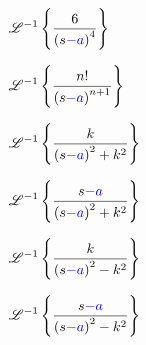 \documentclass[multi={mymath},convert={density=1200}]{standalone}
\newenvironment{mymath}{$\displaystyle}{$}
\newcommand{\invLap}{\ensuremath{\mathscr{L}^{-1}}}
\begin{document}
\begin{mymath}
  \invLap\left\{ 
    \frac{6}{\left(s{\color{blue}-a}\right)^{4}}
  \right\} 
\end{mymath}

\begin{mymath}
  \invLap\left\{ 
    \frac{n!}{\left(s{\color{blue}-a}\right)^{n+1}}
  \right\} 
\end{mymath}

\begin{mymath}
  \invLap\left\{ 
    \frac{k}{\left(s{\color{blue}-a}\right)^{2}+k^{2}}
  \right\} 
\end{mymath}

\begin{mymath}
  \invLap\left\{ 
    \frac{s{\color{blue}-a}}{\left(s{\color{blue}-a}\right)^{2}+k^{2}}
  \right\} 
\end{mymath}

\begin{mymath}
  \invLap\left\{ 
    \frac{k}{\left(s{\color{blue}-a}\right)^{2}-k^{2}}
  \right\} 
\end{mymath}

\begin{mymath}
  \invLap\left\{ 
    \frac{s{\color{blue}-a}}{\left(s{\color{blue}-a}\right)^{2}-k^{2}}
  \right\} 
\end{mymath}
\end{document}
